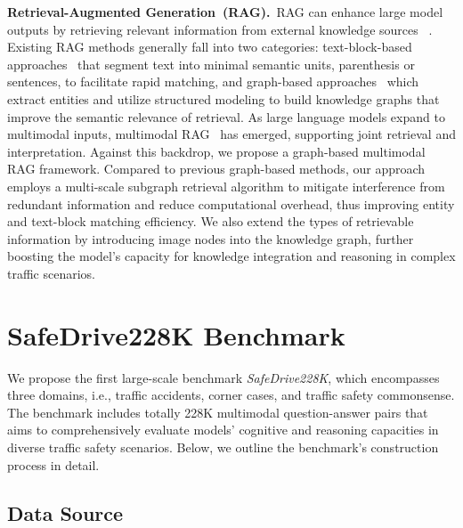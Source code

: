 \documentclass[sigconf]{acmart}
\begin{document}
\noindent\textbf{Retrieval-Augmented Generation~(RAG).}~RAG can enhance large model outputs by retrieving relevant information from external knowledge sources ~\cite{ding2024retrieveneeds,gao2024retrievalaugmented}. %
Existing RAG methods generally fall into two categories: text-block-based approaches~\cite{mao2020generation,qian2024memorag} that segment text into minimal semantic units, parenthesis or sentences, to facilitate rapid matching, and graph-based approaches~\cite{edge2025localglobalgraphrag,guo2024lightrag,8954105,fan2025minirag} which extract entities and utilize structured modeling to build knowledge graphs that improve the semantic relevance of retrieval. As large language models expand to multimodal inputs, multimodal RAG~\cite{hu2023reveal,chen2022murag} has emerged, supporting joint retrieval and interpretation. Against this backdrop, we propose a graph-based multimodal RAG framework. Compared to previous graph-based methods, our approach employs a multi-scale subgraph retrieval algorithm to mitigate interference from redundant information and reduce computational overhead, thus improving entity and text-block matching efficiency. We also extend the types of retrievable information by introducing image nodes into the knowledge graph, further boosting the model’s capacity for knowledge integration and reasoning in complex traffic scenarios.


\section{SafeDrive228K Benchmark}

We propose the first large-scale benchmark \emph{SafeDrive228K}, which encompasses three domains, i.e., traffic accidents, corner cases, and traffic safety commonsense. The benchmark includes totally 228K multimodal question-answer pairs that aims to comprehensively evaluate models’ cognitive and reasoning capacities in diverse traffic safety scenarios. Below, we outline the benchmark’s construction process in detail.

\subsection{Data Source}
\end{document}
